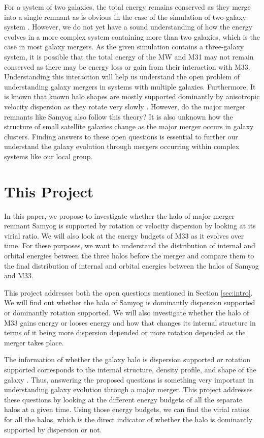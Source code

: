\documentclass[twocolumn]{aastex631}
\begin{document}
For a system of two galaxies, the total energy remains conserved as they merge into a single remnant as is obvious in the case of the simulation of two-galaxy system \citep{same_mass_merger_1}. However, we do not yet have a sound understanding of how the energy evolves in a more complex system containing more than two galaxies, which is the case in most galaxy mergers. As the given simulation contains a three-galaxy system, it is possible that the total energy of the MW and M31 may not remain conserved as there may be energy loss or gain from their interaction with M33. Understanding this interaction will help us understand the open problem of understanding galaxy mergers in systems with multiple galaxies. Furthermore, It is known that known halo shapes are mostly supported dominantly by anisotropic velocity dispersion as they rotate very slowly \citep{spin_param_explain}. However, do the major merger remnants like Samyog also follow this theory? It is also unknown how the structure of small satellite galaxies change as the major merger occurs in galaxy clusters. Finding answers to these open questions is essential to further our understand the galaxy evolution through mergers occurring within complex systems like our local group.

\section{This Project}
\label{sec:proj}
In this paper, we propose to investigate whether the halo of major merger remnant Samyog is supported by rotation or velocity dispersion by looking at its virial ratio. We will also look at the energy budgets of M33 as it evolves over time. For these purposes, we want to understand the distribution of internal and orbital energies between the three halos before the merger and compare them to the final distribution of internal and orbital energies between the halos of Samyog and M33. 

This project addresses both the open questions mentioned in Section \ref{sec:intro}. We will find out whether the halo of Samyog is dominantly dispersion supported or dominantly rotation supported. We will also investigate whether the halo of M33 gains energy or looses energy and how that changes its internal structure in terms of it being more dispersion depended or more rotation depended as the merger takes place.

The information of whether the galaxy halo is dispersion supported or rotation supported corresponds to the internal structure, density profile, and shape of the galaxy \citep{same_mass_merger_1, same_mass_merger_2}. Thus, answering the proposed questions is something very important in understanding galaxy evolution through a major merger. This project addresses these questions by looking at the different energy budgets of all the separate halos at a given time. Using those energy budgets, we can find the virial ratios for all the halos, which is the direct indicator of whether the halo is dominantly supported by dispersion or not.   
\end{document}

